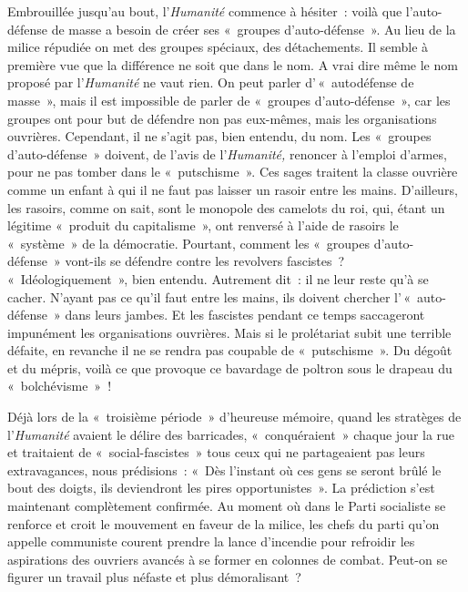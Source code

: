 \documentclass[french,twoside]{book} %
\begin{document}
Embrouillée jusqu’au bout, l’\emph{Humanité} commence à hésiter : voilà que l’auto-défense de masse a besoin de créer ses « groupes d’auto-défense ». Au lieu de la milice répudiée on met des groupes spéciaux, des détachements. Il semble à première vue que la différence ne soit que dans le nom. A vrai dire même le nom proposé par l’\emph{Humanité} ne vaut rien. On peut parler d’ « autodéfense de masse », mais il est impossible de parler de « groupes d’auto-défense », car les groupes ont pour but de défendre non pas eux-mêmes, mais les organisations  ouvrières. Cependant, il ne s’agit pas, bien entendu, du nom. Les « groupes d’auto-défense » doivent, de l’avis de l’\emph{Humanité,} renoncer à l’emploi d’armes, pour ne pas tomber dans le « putschisme ». Ces sages traitent la classe ouvrière comme un enfant à qui il ne faut pas laisser un rasoir entre les mains. D’ailleurs, les rasoirs, comme on sait, sont le monopole des camelots du roi, qui, étant un légitime « produit du capitalisme », ont renversé à l’aide de rasoirs le « système » de la démocratie. Pourtant, comment les « groupes d’auto-défense » vont-ils se défendre contre les revolvers fascistes ? « Idéologiquement », bien entendu. Autrement dit : il ne leur reste qu’à se cacher. N’ayant pas ce qu’il faut entre les mains, ils doivent chercher l’ « auto-défense » dans leurs jambes. Et les fascistes pendant ce temps saccageront impunément les organisations ouvrières. Mais si le prolétariat subit une terrible défaite, en revanche il ne se rendra pas coupable de « putschisme ». Du dégoût et du mépris, voilà ce que provoque ce bavardage de poltron sous le drapeau du « bolchévisme » !\par
Déjà lors de la « troisième période » d’heureuse mémoire, quand les stratèges de l’\emph{Humanité} avaient le délire des barricades, « conquéraient » chaque jour la rue et traitaient de « social-fascistes » tous ceux qui ne partageaient pas leurs extravagances, nous prédisions : « Dès l’instant où ces gens se seront brûlé le bout des doigts, ils deviendront les pires opportunistes ». La prédiction s’est maintenant complètement confirmée. Au moment où dans le Parti socialiste se renforce et croit le mouvement en faveur de la milice, les chefs du parti qu’on appelle communiste courent prendre la lance d’incendie pour refroidir les aspirations des ouvriers avancés à se former en colonnes de combat. Peut-on se figurer un travail plus néfaste et plus démoralisant ?
\end{document}
